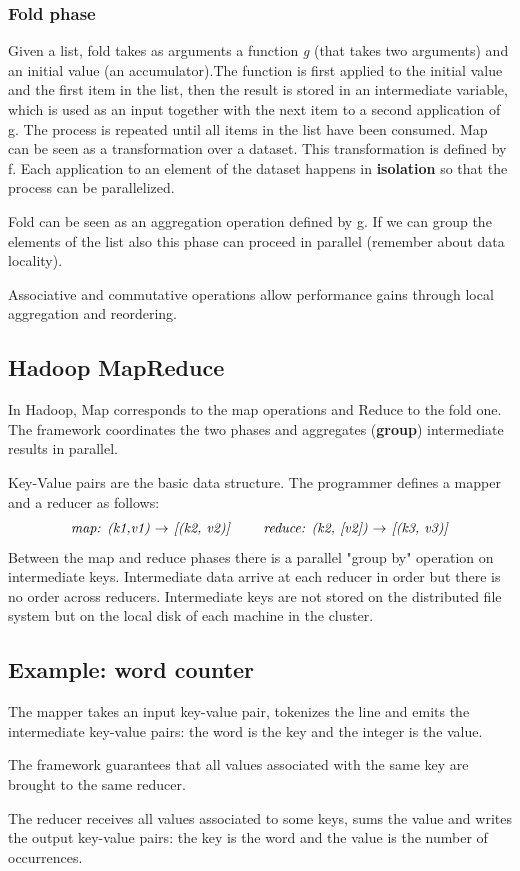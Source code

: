 \subsubsection{Fold phase} 
Given a list, fold takes as arguments a function \textit{g} (that takes two arguments) and an initial value (an accumulator).The function is first applied to the initial value and the first item in the list, then the result is stored in an intermediate variable, which is used as an input together with the next item to a second application of g. The process is repeated until all items in the list have been consumed.
\newline\newline
Map can be seen as a transformation over a dataset. This transformation is defined by f. Each application to an element of the dataset happens in \textbf{isolation} so that the process can be parallelized.
\par
Fold can be seen as an aggregation operation defined by g. If we can group the elements of the list also this phase can proceed in parallel (remember about data locality).
\par
Associative and commutative operations allow performance gains through local aggregation and reordering.
\subsection{Hadoop MapReduce}
In Hadoop, Map corresponds to the map operations and Reduce to the fold one. The framework coordinates the two phases and aggregates (\textbf{group}) intermediate results in parallel.
\par
Key-Value pairs are the basic data structure. The programmer defines a mapper and a reducer as follows:
\[
\textit{map: (k1,v1) $\rightarrow$ [(k2, v2)] \qquad reduce: (k2, [v2]) $\rightarrow$ [(k3, v3)]}
\]
Between the map and reduce phases there is a parallel "group by" operation on intermediate keys. Intermediate data arrive at each reducer in order but there is no order across reducers. Intermediate keys are not stored on the distributed file system but on the local disk of each machine in the cluster.
\subsection{Example: word counter}
The mapper takes an input key-value pair, tokenizes the line and emits the intermediate key-value pairs: the word is the key and the integer is the value.
\par
The framework guarantees that all values associated with the same key are brought to the same reducer.
\par
The reducer receives all values associated to some keys, sums the value and writes the output key-value pairs: the key is the word and the value is the number of occurrences.
